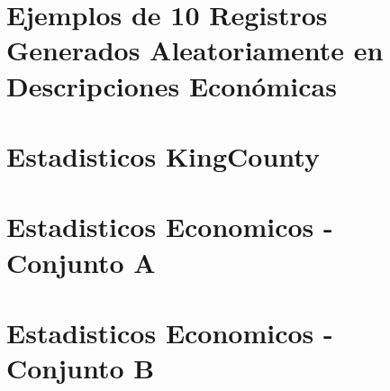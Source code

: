 \section{Ejemplos de 10 Registros Generados Aleatoriamente en Descripciones Económicas}
\label{ejemplo-10-aleatoreos-b}


\section{Estadisticos KingCounty}
\label{propiedades-estadisticas-kingCounty}


\section{Estadisticos Economicos - Conjunto A}
\label{propiedades-estadisticas-economicos-A}



\section{Estadisticos Economicos - Conjunto B}
\label{propiedades-estadisticas-economicos-B}


